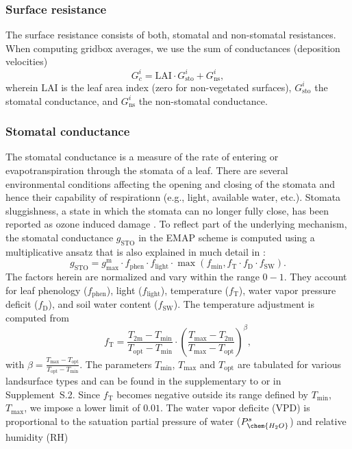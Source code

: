 \documentclass[gmd, manuscript]{copernicus}
\begin{document}
\subsubsection{Surface resistance}
\label{subsubsec:Rc}
The surface resistance consists of both, stomatal and non-stomatal resistances. When computing gridbox averages, we use the sum of conductances (deposition velocities)
\begin{equation}
  G_c^i = \text{LAI} \cdot G_\text{sto}^i + G_\text{ns}^i, 
\end{equation}
wherein $\text{LAI}$ is the leaf area index (zero for non-vegetated surfaces), $G_\text{sto}^i$ the stomatal conductance, and $G_\text{ns}^i$ the non-stomatal conductance.

\subsubsection*{Stomatal conductance}
The stomatal conductance is a measure of the rate of  entering or evapotranspiration through the stomata of a leaf. There are several environmental conditions affecting the opening and closing of the stomata and hence their capability of respirationn (e.g., light, available water, etc.). Stomata sluggishness, a state in which the stomata can no longer fully close, has been reported as ozone induced damage \citep{SR:Hoshika2015}. To reflect part of the underlying mechanism, the stomatal conductance $g_\text{STO}$ in the EMAP scheme is computed using a multiplicative ansatz that is also explained in much detail in \citet{ICP:MappingManual2017}:
%
\begin{equation}
  g_\text{STO} = g^\text{m}_\text{max} \cdot f_\text{phen} \cdot f_\text{light} \cdot \max{(f_\text{min}, f_\text{T} \cdot f_\text{D} \cdot f_\text{SW})}.
\end{equation}
%
The factors herein are normalized and vary within the range $0-1$. They account for leaf phenology ($f_\text{phen}$), light ($f_\text{light}$), temperature ($f_\text{T}$), water vapor pressure deficit ($f_\text{D}$), and soil water content ($f_\text{SW}$).
The temperature adjustment is computed from
%
\begin{equation}
  f_\text{T} = \frac{T_\text{2m}-T_\text{min}}{T_\text{opt}-T_\text{min}} \cdot \left(\frac{T_{\text{max}}-T_\text{2m}}{T_{\text{max}}-T_\text{opt}}\right)^\beta, 
\end{equation}
with $\beta = \frac{T_\text{max}-T_\text{opt}}{T_\text{opt}-T_\text{min}}$. The parameters $T_\text{min}$, $T_\text{max}$ and $T_\text{opt}$ are tabulated for various landsurface types and can be found in the supplementary to \citet{ACP:Simpson2012} or in Supplement~S.2. Since $f_\text{T}$ becomes negative outside its range defined by $T_\text{min}$, $T_\text{max}$, we impose a lower limit of $0.01$. The water vapor deficite (VPD) is proportional to the satuation partial pressure of water ($P_\chem{H_2O}^s$) and relative humidity ($\text{RH}$)
\end{document}
